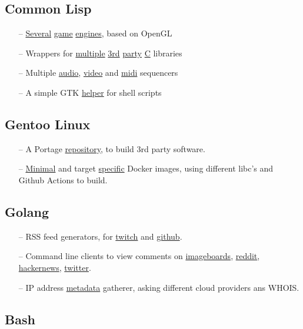 \documentclass[11pt]{article}
\newcommand{\git}[2]{\href {https://github.com/azimut/{#2}} {#1}}
\begin{document}
\subsection{Common Lisp}
\begin{itemize}
  \setlength{\parskip}{0pt}
  \setlength{\itemsep}{0pt plus 1pt}
  \item[--] \git{Several}{shiny} \git{game}{incandescent} \git{engines}{scenic}, based on OpenGL
  \item[--] Wrappers for \git{multiple}{cl-gme} \git{3rd}{espeak-ng} \git{party}{aubio} \git{C}{cloud} libraries
  \item[--] Multiple \git{audio}{meniere}, \git{video}{viseq} and \git{midi}{launchpad-csound} sequencers
  \item[--] A simple GTK \git{helper}{ipickme} for shell scripts
\end{itemize}

\subsection{Gentoo Linux}
\begin{itemize}
  \setlength{\parskip}{0pt}
  \setlength{\itemsep}{0pt plus 1pt}
  \item[--] A Portage \git{repository}{overlay}, to build 3rd party software.
  \item[--] \git{Minimal}{kubler-dock} and target \git{specific}{gantoo} Docker images, using different libc's and Github Actions to build.
\end{itemize}

\subsection{Golang}
\begin{itemize}
  \setlength{\parskip}{0pt}
  \setlength{\itemsep}{0pt plus 1pt}
  \item[--] RSS feed generators, for \git{twitch}{twitch-rss} and \git{github}{github-rss}.
  \item[--] Command line clients to view comments on
    \git{imageboards}{lainviewer},
    \git{reddit}{redditviewer},
    \git{hackernews}{cli-view},
    \git{twitter}{cli-view}.
  \item[--] IP address \git{metadata}{sunny} gatherer, asking different cloud providers ans WHOIS.
\end{itemize}

\subsection{Bash}
\end{document}
